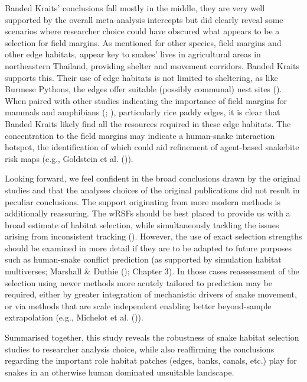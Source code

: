 \documentclass[10pt,a4paper]{article}
\begin{document}
Banded Kraits' conclusions fall mostly in the middle, they are very well supported by the overall meta-analysis intercepts but did clearly reveal some scenarios where researcher choice could have obscured what appears to be a selection for field margins.
As mentioned for other species, field margins and other edge habitats, appear key to snakes' lives in agricultural areas in northeastern Thailand, providing shelter and movement corridors.
Banded Kraits supports this.
Their use of edge habitats is not limited to sheltering, as like Burmese Pythons, the edges offer suitable (possibly communal) nest sites ().
When paired with other studies indicating the importance of field margins for mammals and amphibians (; ), particularly rice paddy edges, it is clear that Banded Kraits likely find all the resources required in these edge habitats.
The concentration to the field margins may indicate a human-snake interaction hotspot, the identification of which could aid refinement of agent-based snakebite risk maps (e.g., Goldstein et al. ()).

Looking forward, we feel confident in the broad conclusions drawn by the original studies and that the analyses choices of the original publications did not result in peculiar conclusions.
The support originating from more modern methods is additionally reassuring.
The wRSFs should be best placed to provide us with a broad estimate of habitat selection, while simultaneously tackling the issues arising from inconsistent tracking ().
However, the use of exact selection strengths should be examined in more detail if they are to be adapted to future purposes such as human-snake conflict prediction (as supported by simulation habitat multiverses; Marshall \& Duthie (); Chapter 3).
In those cases reassessment of the selection using newer methods more acutely tailored to prediction may be required, either by greater integration of mechanistic drivers of snake movement, or via methods that are scale independent enabling better beyond-sample extrapolation (e.g., Michelot et al. ()).

Summarised together, this study reveals the robustness of snake habitat selection studies to researcher analysis choice, while also reaffirming the conclusions regarding the important role habitat patches (edges, banks, canals, etc.) play for snakes in an otherwise human dominated unsuitable landscape.
\end{document}
